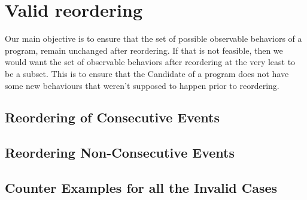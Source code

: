 
\section{Valid reordering}
    

Our main objective is to ensure that the set of possible observable behaviors of a program, remain unchanged after reordering. If that is not feasible, then we would want the set of observable behaviors after reordering at the very least to be a subset. This is to ensure that the Candidate of a program does not have some new behaviours that weren't supposed to happen prior to reordering.   

    \subsection{Reordering of Consecutive Events}
        

        

    \subsection{Reordering Non-Consecutive Events}

        

    \subsection{Counter Examples for all the Invalid Cases}
        

